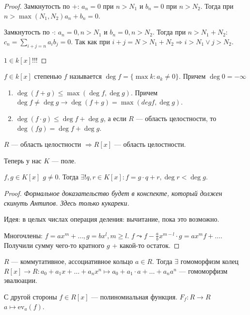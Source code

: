 \begin{proof}
    Замкнутость по $+$:  $a_n = 0$ при  $n > N_1$ и  $b_n = 0$ при $n > N_2$. Тогда при $n > \max(N_1, N_2) a_n+b_n = 0$.

    Замкнутость по $\cdot$:  $a_n = 0, n > N_1$ и $b_n = 0, n > N_2$. Тогда при  $n > N_1+N_2:$ $c_n = \sum_{i+j=n} a_ib_j = 0$. Так как при  $i + j = N > N_1+N_2 \Rightarrow i > N_1 \lor j > N_2$.

    $1 \in k[x]$!!!
\end{proof}
\begin{definition}
    $f \in k[x]$ степенью  $f$ называется  $\deg f = \{\max k: a_k \neq 0\}$. Причем $\deg 0 = -\infty$
\end{definition}
\begin{properties}
    \slashn
    \begin{enumerate}
        \item $\deg (f+g) \le \max(\deg f, \deg g)$. Причем $\deg f \neq \deg g \to \deg(f+g) = \max(deg f, \deg g)$. 
        \item $\deg(f\cdot g) \le \deg f + \deg g$, а если $R$ --- область целостности, то  $\deg (fg) = \deg f + \deg g$.
    \end{enumerate}
\end{properties}
\begin{consequence}
    $R$ --- область целостности  $\Rightarrow R[x]$ --- область целостности.
\end{consequence}
\slashn
Теперь у нас $K$ --- поле.
\begin{theorem}
    $f, g \in K[x]$ $g \neq 0$. Тогда  $\exists! q, r \in K[x]: f = g\cdot q + r, \deg r < \deg g$.
\end{theorem}
\begin{proof}
    \textit{Формальное доказательство будет в конспекте, который должен скинуть Антипов. Здесь только кукареки.}

    Идея: в целых числах операция деления: вычитание, пока это возможно.

    Многочлены: $f=ax^m + \ldots, g = bx^l, m\ge l$. $f \leadsto f - \frac{a}{b}x^{m-l} \cdot g = ax^mf + \ldots$. Получили сумму чего-то кратного $g$ + какой-то остаток. 
\end{proof}
\begin{consequence}
    $R$ --- коммутативное, ассоциативное кольцо  $a \in R$. Тогда $\exists$ гомоморфизм колец  $R[x] \to R: a_0 + a_1 x + \ldots + a_n x^n \mapsto a_0 + a_1 \cdot a + \ldots + a_n a^n$ --- гомоморфизм эвалюации. 

    С другой стороны $f \in R[x]$ --- полиномиальная функция.  $F_f: R \to R$  $a \mapsto \text{ev}_a(f)$.
\end{consequence}
